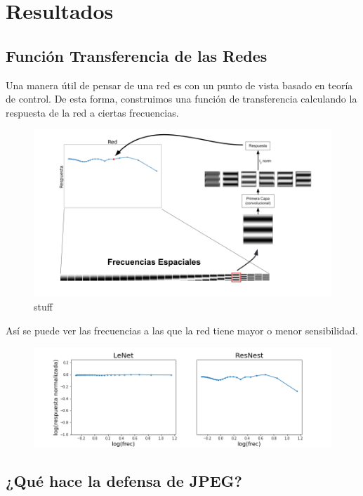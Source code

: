 \section{Resultados}
\subsection{Función Transferencia de las Redes}
Una manera útil de pensar de una red es con un punto de vista basado en teoría de control. De esta forma, construimos una función de transferencia calculando la respuesta de la red a ciertas frecuencias. 
\begin{figure}[h!]
    \centering
    \includegraphics[width=\textwidth]{images/bode_diagrams/explanation_bode.png}
    \caption{stuff}
    \label{bode_explain}
\end{figure}

Así se puede ver las frecuencias a las que la red tiene mayor o menor sensibilidad.

\begin{figure}[h!]
    \centering
    \includegraphics[width=\textwidth]{images/bode_diagrams/mnist_nets.png}
\end{figure}
\subsection{¿Qué hace la defensa de JPEG?}

